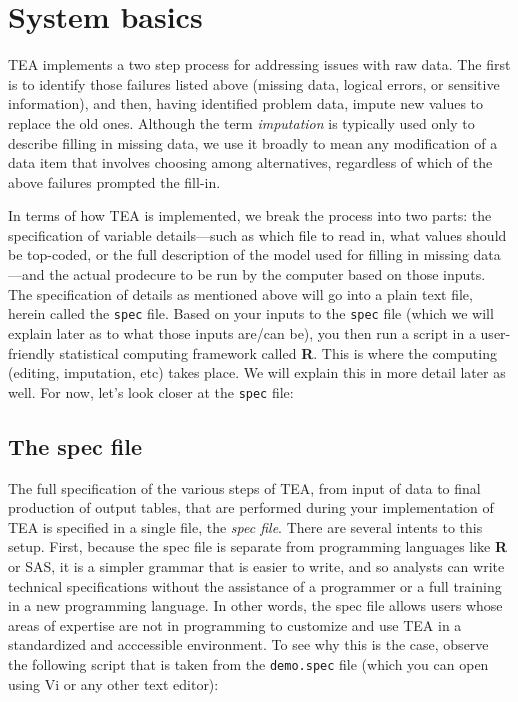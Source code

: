 \documentclass{article}
\begin{document}
\section{System basics}
TEA implements a two step process for addressing issues with raw data. The first is to
identify those failures listed above (missing data, logical errors, or sensitive
information), and then, having identified problem data, impute new values
to replace the old ones. Although the term {\em imputation} is typically used only to 
describe filling in missing data, we use it broadly to mean any modification of a 
data item that involves choosing among alternatives, regardless of which of the 
above failures prompted the fill-in. 

In terms of how TEA is implemented, we break the process into two parts: the 
specification of variable details---such as which file to read in, what values should 
be top-coded, or the full description of the model used for filling in missing 
data---and the actual prodecure to be run by the computer based on those inputs. 
The specification of details as mentioned above will go into a plain text file, 
herein called the {\tt spec} file. Based on your inputs to the {\tt spec} file 
(which we will explain later as to what those inputs are/can be), you then run 
a script in a user-friendly statistical computing framework called {\bf R}. This is 
where the computing (editing, imputation, etc) takes place. We will explain this in 
more detail later as well. For now, let's look closer at the {\tt spec} file: 

\subsection{The spec file}\label{specsec}
The full specification of the various steps of TEA, from input of data to final 
production of output tables, that are performed during your implementation of TEA 
is specified in a single file, the {\em spec file}. There are several intents to 
this setup. First, because the spec file is separate from programming
languages like \textbf{R} or SAS, it is a simpler grammar that is easier to write, and so 
analysts can write technical specifications without the assistance of a programmer or
a full training in a new programming language. In other words, the spec file allows 
users whose areas of expertise are not in programming to customize and use TEA in a 
standardized and acccessible environment. To see why this is the case, observe the 
following script that is taken from the {\tt demo.spec} file (which you can open using 
Vi or any other text editor):
\end{document}
